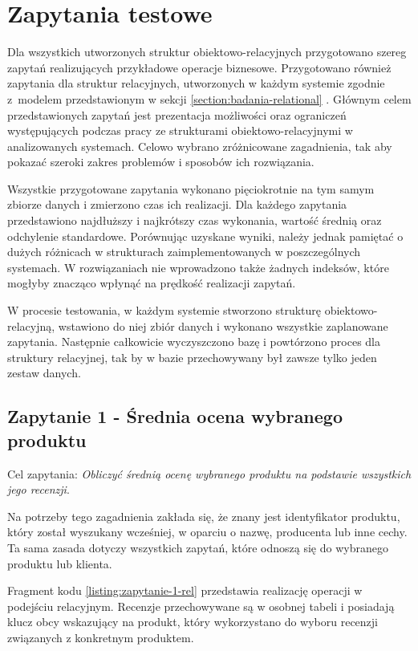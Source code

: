 \documentclass[a4paper,twoside,12pt]{book}
\begin{document}
\section{Zapytania testowe}

Dla wszystkich utworzonych struktur obiektowo-relacyjnych przygotowano szereg zapytań realizujących przykładowe operacje biznesowe. Przygotowano również zapytania dla struktur relacyjnych, utworzonych w każdym systemie zgodnie z~modelem przedstawionym w sekcji \ref{section:badania-relational} . Głównym celem przedstawionych zapytań jest prezentacja możliwości oraz ograniczeń występujących podczas pracy ze strukturami obiektowo-relacyjnymi w analizowanych systemach. Celowo wybrano zróżnicowane zagadnienia, tak aby pokazać szeroki zakres problemów i sposobów ich rozwiązania.

Wszystkie przygotowane zapytania wykonano pięciokrotnie na tym samym zbiorze danych i zmierzono czas ich realizacji. Dla każdego zapytania przedstawiono najdłuższy i najkrótszy czas wykonania, wartość średnią oraz odchylenie standardowe. Porównując uzyskane wyniki, należy jednak pamiętać o dużych różnicach w strukturach zaimplementowanych w poszczególnych systemach. W rozwiązaniach nie wprowadzono także żadnych indeksów, które mogłyby znacząco wpłynąć na prędkość realizacji zapytań.

W procesie testowania, w każdym systemie stworzono strukturę obiektowo-relacyjną, wstawiono do niej zbiór danych i wykonano wszystkie zaplanowane zapytania. Następnie całkowicie wyczyszczono bazę i powtórzono proces dla struktury relacyjnej, tak by w bazie przechowywany był zawsze tylko jeden zestaw danych.

\subsection{Zapytanie 1 - Średnia ocena wybranego produktu}

Cel zapytania: \textit{Obliczyć średnią ocenę wybranego produktu na podstawie wszystkich jego recenzji}. 

Na potrzeby tego zagadnienia zakłada się, że znany jest identyfikator produktu, który został wyszukany wcześniej, w oparciu o nazwę, producenta lub inne cechy. Ta sama zasada dotyczy wszystkich zapytań, które odnoszą się do wybranego produktu lub klienta.

Fragment kodu \ref{listing:zapytanie-1-rel} przedstawia realizację operacji w podejściu relacyjnym. Recenzje przechowywane są w osobnej tabeli i posiadają klucz obcy wskazujący na produkt, który wykorzystano do wyboru recenzji związanych z konkretnym produktem. 
\end{document}
